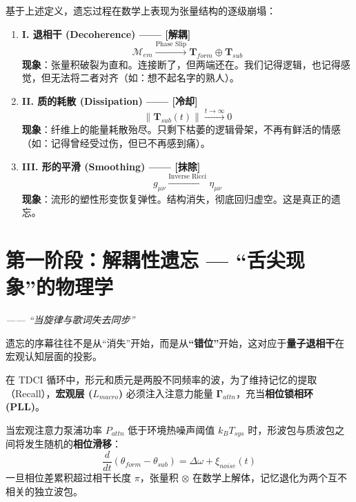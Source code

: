 
基于上述定义，遗忘过程在数学上表现为张量结构的逐级崩塌：

\begin{enumerate}
    \item \textbf{I. 退相干 (Decoherence) —— [解耦]}
    $$ \mathcal{M}_{em} \xrightarrow{\text{Phase Slip}} \mathbf{T}_{form} \oplus \mathbf{T}_{sub} $$
    \textbf{现象}：张量积破裂为直和。连接断了，但两端还在。我们记得逻辑，也记得感觉，但无法将二者对齐（如：想不起名字的熟人）。

    \item \textbf{II. 质的耗散 (Dissipation) —— [冷却]}
    $$ \|\mathbf{T}_{sub}(t)\| \xrightarrow{t \to \infty} 0 $$
    \textbf{现象}：纤维上的能量耗散殆尽。只剩下枯萎的逻辑骨架，不再有鲜活的情感（如：记得曾经受过伤，但已不再感到痛）。

    \item \textbf{III. 形的平滑 (Smoothing) —— [抹除]}
    $$ g_{\mu\nu} \xrightarrow{\text{Inverse Ricci}} \eta_{\mu\nu} $$
    \textbf{现象}：流形的塑性形变恢复弹性。结构消失，彻底回归虚空。这是真正的遗忘。
\end{enumerate}

\section{第一阶段：解耦性遗忘 — “舌尖现象”的物理学}
\label{sec:decoupling_phase}

\textit{—— “当旋律与歌词失去同步”}

遗忘的序幕往往不是从“消失”开始，而是从\textbf{“错位”}开始，这对应于\textbf{量子退相干}在宏观认知层面的投影。


在 TDCI 循环中，形元和质元是两股不同频率的波，为了维持记忆的提取（Recall），\textbf{宏观层 ($L_{macro}$)} 必须注入注意力能量 $\mathbf{\Gamma}_{attn}$，充当\textbf{相位锁相环 (PLL)}。

\begin{theorem}[认知退相干定理]
    当宏观注意力泵浦功率 $P_{attn}$ 低于环境热噪声阈值 $k_B T_{sys}$ 时，形波包与质波包之间将发生随机的\textbf{相位滑移}：
    $$ \frac{d}{dt} (\theta_{form} - \theta_{sub}) = \Delta \omega + \xi_{noise}(t) $$
    一旦相位差累积超过相干长度 $\pi$，张量积 $\otimes$ 在数学上解体，记忆退化为两个互不相关的独立波包。
\end{theorem}


